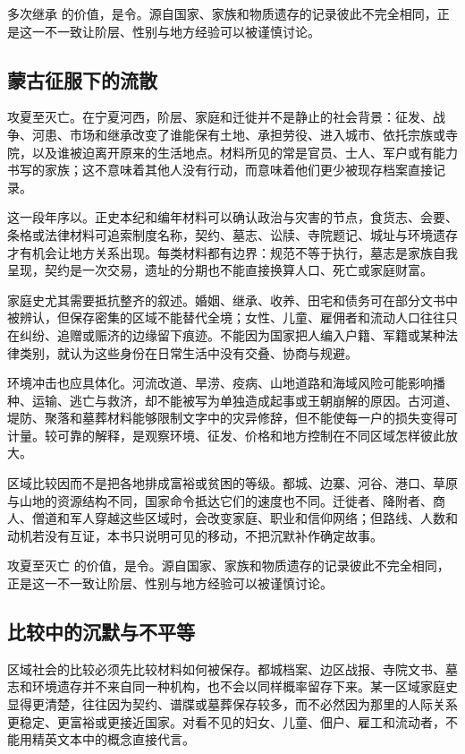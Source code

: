 多次继承 的价值，是令。源自国家、家族和物质遗存的记录彼此不完全相同，正是这一不一致让阶层、性别与地方经验可以被谨慎讨论。

\subsection{蒙古征服下的流散}

攻夏至灭亡。在宁夏河西，阶层、家庭和迁徙并不是静止的社会背景：征发、战争、河患、市场和继承改变了谁能保有土地、承担劳役、进入城市、依托宗族或寺院，以及谁被迫离开原来的生活地点。材料所见的常是官员、士人、军户或有能力书写的家族；这不意味着其他人没有行动，而意味着他们更少被现存档案直接记录。

这一段年序以。正史本纪和编年材料可以确认政治与灾害的节点，食货志、会要、条格或法律材料可追索制度名称，契约、墓志、讼牍、寺院题记、城址与环境遗存才有机会让地方关系出现。每类材料都有边界：规范不等于执行，墓志是家族自我呈现，契约是一次交易，遗址的分期也不能直接换算人口、死亡或家庭财富。

家庭史尤其需要抵抗整齐的叙述。婚姻、继承、收养、田宅和债务可在部分文书中被辨认，但保存密集的区域不能替代全境；女性、儿童、雇佣者和流动人口往往只在纠纷、追赠或赈济的边缘留下痕迹。不能因为国家把人编入户籍、军籍或某种法律类别，就认为这些身份在日常生活中没有交叠、协商与规避。

环境冲击也应具体化。河流改道、旱涝、疫病、山地道路和海域风险可能影响播种、运输、逃亡与救济，却不能被写为单独造成起事或王朝崩解的原因。古河道、堤防、聚落和墓葬材料能够限制文字中的灾异修辞，但不能使每一户的损失变得可计量。较可靠的解释，是观察环境、征发、价格和地方控制在不同区域怎样彼此放大。

区域比较因而不是把各地排成富裕或贫困的等级。都城、边寨、河谷、港口、草原与山地的资源结构不同，国家命令抵达它们的速度也不同。迁徙者、降附者、商人、僧道和军人穿越这些区域时，会改变家庭、职业和信仰网络；但路线、人数和动机若没有互证，本书只说明可见的移动，不把沉默补作确定故事。

攻夏至灭亡 的价值，是令。源自国家、家族和物质遗存的记录彼此不完全相同，正是这一不一致让阶层、性别与地方经验可以被谨慎讨论。

\subsection{比较中的沉默与不平等}

区域社会的比较必须先比较材料如何被保存。都城档案、边区战报、寺院文书、墓志和环境遗存并不来自同一种机构，也不会以同样概率留存下来。某一区域家庭史显得更清楚，往往因为契约、谱牒或墓葬保存较多，而不必然因为那里的人际关系更稳定、更富裕或更接近国家。对看不见的妇女、儿童、佃户、雇工和流动者，不能用精英文本中的概念直接代言。

